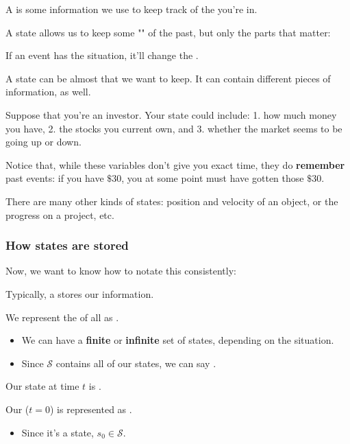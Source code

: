         \begin{definition}
            A  is some information we use to keep track of the  you're in.
            
            A state allows us to keep some "" of the past, but only the parts that matter:
            
            If an event has  the situation, it'll change the .
            
            A state can be almost  that we want to keep. It can contain  different pieces of information, as well.
        \end{definition}
        
        \miniex Suppose that you're an investor. Your state could include: 1. how much money you have, 2. the stocks you current own, and 3. whether the market seems to be going up or down.
        
        Notice that, while these variables don't give you exact time, they do \textbf{remember} past events: if you have $\$30$, you at some point must have gotten those $\$30$.
        
        There are many other kinds of states: position and velocity of an object, or the progress on a project, etc.
        
        \subsecdiv
        
        \subsubsection{How states are stored}
    
            Now, we want to know how to notate this consistently:\\
            
            \begin{notation}
                Typically, a   stores our information.
                
                We represent the  of all  as . 
                
                \begin{itemize}
                    \item We can have a \textbf{finite} or \textbf{infinite} set of states, depending on the situation.
                    \item Since $\mathcal{S}$ contains all of our states, we can say .
                \end{itemize}
                
                Our state at time $t$ is .
                
                Our  ($t=0$) is represented as .         
                \begin{itemize}
                    \item Since it's a state, $s_0 \in \mathcal{S}$.
                \end{itemize}
            \end{notation}
            
